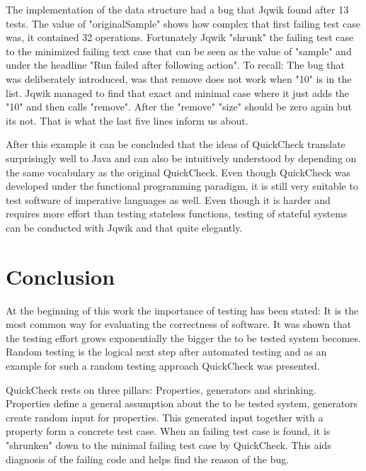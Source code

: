 \documentclass[a4paper, 12pt]{article} %
\begin{document}
The implementation of the data structure had a bug that Jqwik found after 13 tests. The value of "originalSample" shows how complex that first failing test case was, it contained 32 operations. Fortunately Jqwik "shrunk" the failing test case to the minimized failing text case that can be seen as the value of "sample" and under the headline "Run failed after following action". To recall: The bug that was deliberately introduced, was that remove does not work when "10" is in the list. Jqwik managed to find that exact and minimal case where it just adds the "10" and then calls "remove". After the "remove" "size" should be zero again but its not. That is what the last five lines inform us about.

After this example it can be concluded that the ideas of QuickCheck translate surprisingly well to Java and can also be intuitively understood by depending on the same vocabulary as the original QuickCheck. Even though QuickCheck was developed under the functional programming paradigm, it is still very suitable to test software of imperative languages as well. Even though it is harder and requires more effort than testing stateless functions, testing of stateful systems can be conducted with Jqwik and that quite elegantly.

\newpage
\section{Conclusion}


At the beginning of this work the importance of testing has been stated: It is the most common way for evaluating the correctness of software. It was shown that the testing effort grows exponentially the bigger the to be tested system becomes. Random testing is the logical next step after automated testing and as an example for such a random testing approach QuickCheck was presented.  


QuickCheck rests on three pillars: Properties, generators and shrinking. Properties define a general assumption about the to be tested system, generators create random input for properties. This generated input together with a property form a concrete test case. When an failing test case is found, it is "shrunken" down to the minimal failing test case by QuickCheck. This aids diagnosis of the failing code and helps find the reason of the bug. 

\end{document}
